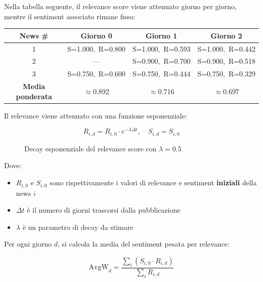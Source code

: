 \documentclass[a4paper,12pt]{article}
\begin{document}
Nella tabella seguente, il relevance score viene attenuato giorno per giorno, mentre il sentiment associato rimane fisso:

\begin{center}
\renewcommand{\arraystretch}{1.4}
\begin{tabular}{|c|c|c|c|}
\hline
\textbf{News \#} & \textbf{Giorno 0} & \textbf{Giorno 1} & \textbf{Giorno 2} \\
\hline
1 & S=1.000,\ R=0.800 & S=1.000,\ R=0.593 & S=1.000,\ R=0.442 \\
2 & ---               & S=0.900,\ R=0.700 & S=0.900,\ R=0.518 \\
3 & S=0.750,\ R=0.600 & S=0.750,\ R=0.444 & S=0.750,\ R=0.329 \\
\hline
\textbf{Media ponderata} & $\approx$0.892 & $\approx$0.716 & $\approx$0.697 \\
\hline
\end{tabular}
\end{center}
Il relevance viene attenuato con una funzione esponenziale:

\[
R_{i,d} = R_{i,0} \cdot e^{-\lambda \Delta t}, \quad S_{i,d} = S_{i,0}
\]
\begin{figure}[H]
\centering
{}
\caption{Decay esponenziale del relevance score con $\lambda = 0.5$}
\end{figure}

Dove:
\begin{itemize}
  \item $R_{i,0}$ e $S_{i,0}$ sono rispettivamente i valori di relevance e sentiment \textbf{iniziali} della news $i$
  \item $\Delta t$ è il numero di giorni trascorsi dalla pubblicazione
  \item $\lambda$ è un parametro di decay da stimare
\end{itemize}

Per ogni giorno $d$, si calcola la media del sentiment pesata per relevance:

\[
\text{AvgW}_d = \frac{\sum_i \left(S_{i,0} \cdot R_{i,d}\right)}{\sum_i R_{i,d}}
\]
\end{document}
